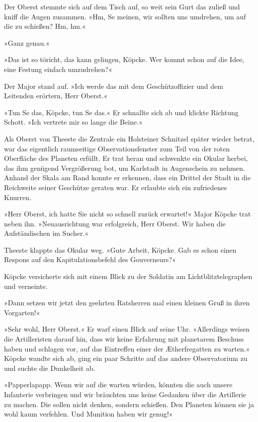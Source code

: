 Der Oberst stemmte sich auf dem Tisch auf, so weit sein Gurt das
zuließ und kniff die Augen zusammen. »Hm, Se meinen, wir sollten
uns umdrehen, um auf die zu schießen? Hm, hm.«

»Ganz genau.«

»Das ist so töricht, das kann gelingen, Köpcke. Wer kommt schon auf
die Idee, eine Festung einfach umzudrehen?«

Der Major stand auf. »Ich werde das mit dem Geschützoffizier und
dem Leitenden erörtern, Herr Oberst.«

»Tun Se das, Köpcke, tun Se das.« Er schnallte sich ab und klickte
Richtung Schott. »Ich vertrete mir so lange die Beine.«

\tb

Als Oberst von Theeste die Zentrale ein Holsteiner Schnitzel später
wieder betrat, war das eigentlich raumseitige Observationsfenster
zum Teil von der roten Oberfläche des Planeten erfüllt. Er trat
heran und schwenkte ein Okular herbei, das ihm genügend
Vergrößerung bot, um Karlstadt in Augenschein zu nehmen. Anhand der
Skala am Rand konnte er erkennen, dass ein Drittel der Stadt in die
Reichweite seiner Geschütze geraten war. Er erlaubte sich ein
zufriedenes Knurren.

»Herr Oberst, ich hatte Sie nicht so schnell zurück erwartet!«
Major Köpcke trat neben ihn. »Neuausrichtung war erfolgreich, Herr
Oberst. Wir haben die Aufständischen im Sucher.«

Theeste klappte das Okular weg. »Gute Arbeit, Köpcke. Gab es schon
einen Respons auf den Kapitulationsbefehl des Gouverneurs?«

Köpcke versicherte sich mit einem Blick zu der Soldatin am
Lichtblitztelegraphen und verneinte.

»Dann setzen wir jetzt den geehrten Ratsherren mal einen kleinen
Gruß in ihren Vorgarten!«

»Sehr wohl, Herr Oberst.« Er warf einen Blick auf seine Uhr.
»Allerdings weisen die Artilleristen darauf hin, dass wir keine
Erfahrung mit planetarem Beschuss haben und schlagen vor, auf das
Eintreffen einer der Ætherfregatten zu warten.« Köpcke wandte sich
ab, ging ein paar Schritte auf das andere Observatorium zu und
suchte die Dunkelheit ab.

»Papperlapapp. Wenn wir auf die warten würden, könnten die auch
unsere Infanterie verbringen und wir bräuchten uns keine Gedanken
über die Artillerie zu machen. Die sollen nicht denken, sondern
schießen. Den Planeten können sie ja wohl kaum verfehlen. Und
Munition haben wir genug!«

